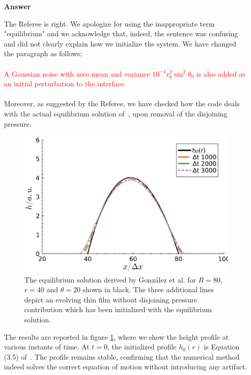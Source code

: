 \documentclass[12pt,english]{article}
\begin{document}
\begin{itemize}
\item[ \textbf{Answer}]
{
The Referee is right. We apologize for using the inappropriate term "equilibrium" and
we acknowledge that, indeed, the sentence was confusing and did not clearly explain how we initialize
 the system. 
We have changed the paragraph as follows:\\
\\
\textcolor{red}{A Gaussian noise with zero mean and variance $10^{-4}r_0^2 \sin^2\theta_0$ is also added as an initial perturbation to the interface.}\\
\\
Moreover, as suggested by the Referee, we have checked how the code deals with the actual equilibrium solution 
of~\cite{gonzalezStabilityLiquidRing2013}, upon removal of the disjoining pressure. 
\begin{figure}
    \centering
    \includegraphics[width=0.85\linewidth]{h0_sim.pdf}
    \caption{The equilibrium solution derived by Gonz\'alez et al. for $R=80$, $r=40$ and $\theta=20$ shown in black.
    The three additional lines depict an evolving thin film without disjoining pressure contribution which has been initialized with the equilibrium solution.}
    \label{fig:h0eq}
\end{figure}
}
The results are reported in figure \ref{fig:h0eq}, where we show the height profile at various instants of time. 
At $t=0$, the initialized profile $h_0(r)$ is Equation (3.5) of~\cite{gonzalezStabilityLiquidRing2013}. The 
profile remains stable, confirming that the numerical method indeed solves the correct equation of motion without 
introducing any artifact. 


\end{itemize}
\end{document}
